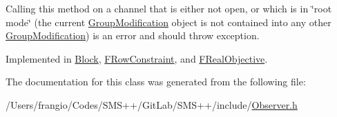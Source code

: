 Calling this method on a channel that is either not open, or which is in \char`\"{}root mode\char`\"{} (the current \mbox{\hyperlink{class_s_m_spp__di__unipi__it_1_1_group_modification}{Group\+Modification}} object is not contained into any other \mbox{\hyperlink{class_s_m_spp__di__unipi__it_1_1_group_modification}{Group\+Modification}}) is an error and should throw exception. 

Implemented in \mbox{\hyperlink{class_s_m_spp__di__unipi__it_1_1_block_a8f87b193f9ae85d75ed4a3ab798e6fe0}{Block}}, \mbox{\hyperlink{class_s_m_spp__di__unipi__it_1_1_f_row_constraint_a8f87b193f9ae85d75ed4a3ab798e6fe0}{F\+Row\+Constraint}}, and \mbox{\hyperlink{class_s_m_spp__di__unipi__it_1_1_f_real_objective_a8f87b193f9ae85d75ed4a3ab798e6fe0}{F\+Real\+Objective}}.



The documentation for this class was generated from the following file\+:\begin{DoxyCompactItemize}
\item 
/\+Users/frangio/\+Codes/\+S\+M\+S++/\+Git\+Lab/\+S\+M\+S++/include/\mbox{\hyperlink{_observer_8h}{Observer.\+h}}\end{DoxyCompactItemize}
